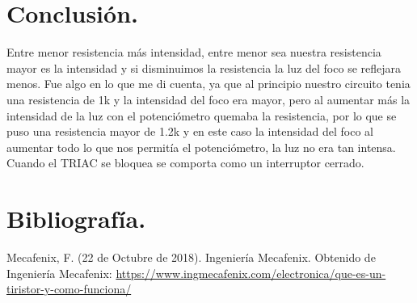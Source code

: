 \documentclass[10pt,a4paper]{article}
\begin{document}
\section{Conclusión.}
Entre menor resistencia más intensidad, entre menor sea nuestra resistencia mayor es la intensidad y si disminuimos la resistencia la luz del foco se reflejara menos. Fue algo en lo que me di cuenta, ya que al principio nuestro circuito tenia una resistencia de 1k y la intensidad del foco era mayor, pero al aumentar más la intensidad de la luz con el potenciómetro quemaba la resistencia, por lo que se puso una resistencia mayor de 1.2k y en este caso la intensidad del foco al aumentar todo lo que nos permitía el potenciómetro, la luz no era tan intensa.\\
\bigskip
Cuando el TRIAC se bloquea se comporta como un interruptor cerrado.
\section{Bibliografía.}
Mecafenix, F. (22 de Octubre de 2018). Ingeniería Mecafenix. Obtenido de Ingeniería Mecafenix: \url{https://www.ingmecafenix.com/electronica/que-es-un-tiristor-y-como-funciona/}
\end{document}
